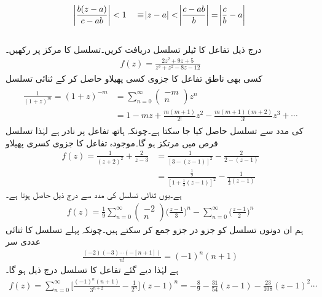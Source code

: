 \begin{align*}
\abs{\frac{b(z-a)}{c-ab}}<1 \quad \equiv \abs{z-a}<\abs{\frac{c-ab}{b}}=\abs{\frac{c}{b}-a}
\end{align*}
\quad {}\\
درج ذیل تفاعل کا ٹیلر تسلسل دریافت کریں۔تسلسل کا مرکز  پر رکھیں۔
\begin{align*}
f(z)=\frac{2z^2+9z+5}{z^3+z^2-8z-12}
\end{align*}
کسی بھی ناطق تفاعل کا جزوی کسی پھیلاو حاصل کر کے ثنائی تسلسل
\begin{gather}
\begin{aligned}\label{مساوات_ٹیلر_عملی_تراکیب_ب}
\frac{1}{(1+z)^m}=(1+z)^{-m}&=\sum\limits_{n=0}^{\infty} \begin{pmatrix}-m\\n  \end{pmatrix} z^n\\
&=1-mz+\frac{m(m+1)}{2!}z^2-\frac{m(m+1)(m+2)}{3!}z^3+\cdots
\end{aligned}
\end{gather} 
کی مدد سے تسلسل حاصل کیا جا سکتا ہے۔چونکہ ہاتھ تفاعل  پر نادر ہے لہٰذا تسلسل قرص  میں مرتکز ہو گا۔موجودہ تفاعل کا جزوی کسری پھیلاو
\begin{align*}
f(z)=\frac{1}{(z+2)^2}+\frac{2}{z-3}&=\frac{1}{[3-(z-1)]^2}-\frac{2}{2-(z-1)}\\
&=\frac{\frac{1}{9}}{[1+\frac{1}{3}(z-1)]^2}-\frac{1}{\frac{1}{2}(z-1)}
\end{align*}
ہے۔یوں ثنائی تسلسل کی مدد سے درج ذیل حاصل ہوتا ہے۔
\begin{align*}
f(z)=\frac{1}{9}\sum\limits_{n=0}^{\infty} \begin{pmatrix}-2\\n \end{pmatrix} \big(\frac{z-1}{3}\big)^n-\sum\limits_{n=0}^{\infty}\big(\frac{z-1}{2}\big)^n
\end{align*} 
ہم ان دونوں تسلسل کو جزو در جزو جمع کر سکتے ہیں۔چونکہ پہلے تسلسل کا ثنائی عددی سر 
\begin{align*}
\tfrac{(-2)(-3)\cdots(-[n+1])}{n!}=(-1)^n(n+1)
\end{align*}
ہے لہٰذا دیے گئے تفاعل کا تسلسل درج ذیل ہو گا۔
\begin{align*}
f(z)=\sum\limits_{n=0}^{\infty}\big[\frac{(-1)^n(n+1)}{3^{n+2}}-\frac{1}{2^n}\big](z-1)^n=-\frac{8}{9}-\frac{31}{54}(z-1)-\frac{23}{108}(z-1)^2\cdots
\end{align*}
